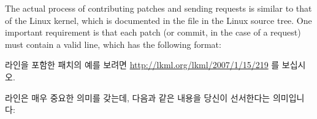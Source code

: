 The actual process of contributing patches and sending 
requests is similar to that of the Linux kernel, which is documented
in the  file in the Linux source tree.
One important requirement is that each patch (or commit, in the case
of a  request) must contain a valid  line,
which has the following format:
\fi

\begin{quote}
	{ \scriptsize
	}
\end{quote}

 라인을 포함한 패치의 예를 보려면
\url{http://lkml.org/lkml/2007/1/15/219} 를 보십시오.
\iffalse

Please see \url{http://lkml.org/lkml/2007/1/15/219} for an example
patch containing a \co{Signed-off-by:} line.
\fi

 라인은 매우 중요한 의미를 갖는데, 다음과 같은 내용을 당신이
선서한다는 의미입니다:
\iffalse

It is important to note that the \co{Signed-off-by:} line has
a very specific meaning, namely that you are certifying that:
\fi


